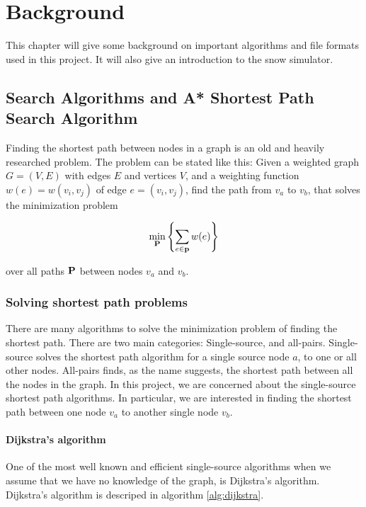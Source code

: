 \chapter{Background}
This chapter will give some background on important algorithms and file formats used in this project. It will also give an introduction to the snow simulator.

\section{Search Algorithms and A* Shortest Path Search Algorithm}
Finding the shortest path between nodes in a graph is an old and heavily researched problem. The problem can be stated like this: Given a weighted graph $G = (V,E)$ with edges $E$ and vertices $V$, and a weighting function $w(e) = w(v_i, v_j)$ of edge $e = (v_i, v_j)$, find the path from $v_a$ to $v_b$, that solves the minimization problem

\begin{equation}
\min_{\mathbf{P}} \left\{ \sum_{e\in \mathbf{p}} w(e) \right\}
\end{equation}

over all paths $\mathbf{P}$ between nodes $v_a$ and $v_b$.

\subsection{Solving shortest path problems}
There are many algorithms to solve the minimization problem of finding the shortest path. There are two main categories: Single-source, and all-pairs. Single-source solves the shortest path algorithm for a single source node $a$, to one or all other nodes. All-pairs finds, as the name suggests, the shortest path between all the nodes in the graph. In this project, we are concerned about the single-source shortest path algorithms. In particular, we are interested in finding the shortest path between one node $v_a$ to another single node $v_b$.

\subsubsection{Dijkstra's algorithm}
One of the most well known and efficient single-source algorithms when we assume that we have no knowledge of the graph, is Dijkstra's algorithm. Dijkstra's algorithm is descriped in algorithm \ref{alg:dijkstra}.

